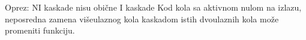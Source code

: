 \begin{frame}[label=02-s030]{Oprez: NI kaskade nisu obične I kaskade}
Kod kola sa aktivnom nulom na izlazu, neposredna zamena višeulaznog kola kaskadom istih dvoulaznih kola može promeniti funkciju.
\par\vspace{2mm}
\centering
\begingroup
\def\DEstabloY{8mm}
\def\DEvrsta{nand}\def\DEodnos{\ne}\def\DEkriticna{0}
\par

\endgroup
\end{frame}
